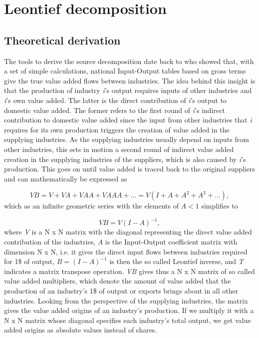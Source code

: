 \documentclass{article}
\begin{document}
\section{Leontief decomposition}

\subsection{Theoretical derivation\\}

The tools to derive the source decomposition date back to \citet{wale36} who showed that, with a set of simple calculations, national Input-Output tables based on gross terms give the true value added flows between industries. The idea behind this insight is that the production of industry \textit{i}'s output requires inputs of other industries and \textit{i}'s own value added. The latter is the direct contribution of \textit{i}'s output to domestic value added. The former refers to the first round of \textit{i}'s indirect contribution to domestic value added since the input from other industries that \textit{i} requires for its own production triggers the creation of value added in the supplying industries. As the supplying industries usually depend on inputs from other industries, this sets in motion a second round of indirect value added creation in the supplying industries of the suppliers, which is also caused by \textit{i}'s production. This goes on until value added is traced back to the original suppliers and can mathematically be expressed as 

\begin{equation}
VB = V + VA + VAA + VAAA + ... = V (I+A+A^{2}+A^{3}+...),
\end{equation}
which as an infinite geometric series with the elements of \(A<1\) simplifies to

\begin{equation}
VB = V (I-A)^{-1},
\end{equation}
where \textit{V} is a N x N matrix with the diagonal representing the direct value added contribution of the industries, \textit{A} is the Input-Output coefficient matrix with dimension N x N, i.e. it gives the direct input flows between industries required for 1\$ of output, \(B = (I-A)^{-1}\) is then the so called Leontief inverse, and \textit{T} indicates a matrix transpose operation. \textit{VB} gives thus a N x N matrix of so called value added multipliers, which denote the amount of value added that the production of an industry's 1\$ of output or exports brings about in all other industries. Looking from the perspective of the supplying industries, the matrix gives the value added origins of an industry's production. If we multiply it with a N x N matrix whose diagonal specifies each industry's total output, we get value added origins as absolute values instead of shares.\\
\end{document}
